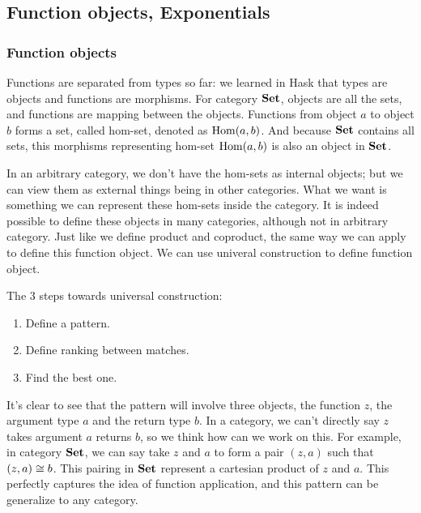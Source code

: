 
\setcounter{section}{8}
\setcounter{subsection}{1}
\subsection{Function objects, Exponentials}

\subsubsection{Function objects}

Functions are separated from types so far: we learned in Hask that types are
objects and functions are morphisms. For category $\mathbf{Set}$, objects are all the
sets, and functions are mapping between the objects. Functions from object $a$
to object $b$ forms a set, called hom-set, denoted as $\operatorname{Hom}(a,b)$. And because
$\mathbf{Set}$ contains all sets, this morphisms representing hom-set $\operatorname{Hom}(a,b)$ is also
an object in $\mathbf{Set}$.

In an arbitrary category, we don't have the hom-sets as internal objects; but we
can view them as external things being in other categories. What we want is
something we can represent these hom-sets inside the category. It is indeed
possible to define these objects in many categories, although not in arbitrary
category. Just like we define product and coproduct, the same way we can apply
to define this function object. We can use univeral construction to define
function object.

\begin{remark} The 3 steps towards universal construction:
\begin{enumerate}
\item Define a pattern.
\item Define ranking between matches.
\item Find the best one.
\end{enumerate}
\end{remark}

It's clear to see that the pattern will involve three objects, the function $z$,
the argument type $a$ and the return type $b$. In a category, we can't directly
say $z$ takes argument $a$ returns $b$, so we think how can we work on this. For
example, in category $\mathbf{Set}$, we can say take $z$ and $a$ to form a pair $(z,a)$
such that $(z,a) \iso b$. This pairing in $\mathbf{Set}$ represent a cartesian product
of $z$ and $a$. This perfectly captures the idea of function application, and
this pattern can be generalize to any category.

